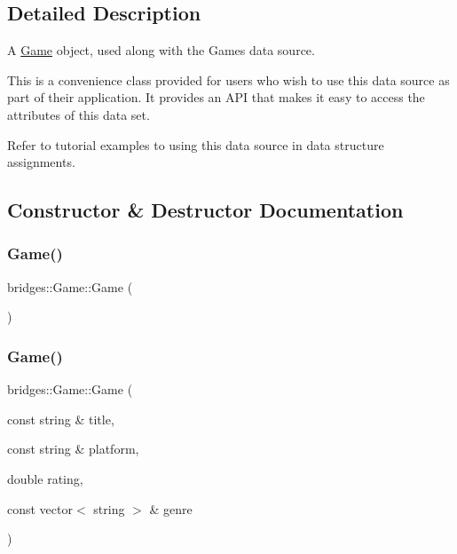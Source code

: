 \subsection{Detailed Description}
A \mbox{\hyperlink{classbridges_1_1_game}{Game}} object, used along with the Games data source. 

This is a convenience class provided for users who wish to use this data source as part of their application. It provides an A\+PI that makes it easy to access the attributes of this data set.

Refer to tutorial examples to using this data source in data structure assignments. 

\subsection{Constructor \& Destructor Documentation}
\mbox{\label{classbridges_1_1_game_a44f625a03ebf144931aa9e7e5440303c}} 
\subsubsection{\texorpdfstring{Game()}{Game()}\hspace{0.1cm}{\footnotesize\ttfamily [1/2]}}
{\footnotesize\ttfamily bridges\+::\+Game\+::\+Game (\begin{DoxyParamCaption}{ }\end{DoxyParamCaption})\hspace{0.3cm}{\ttfamily [inline]}}

\mbox{\label{classbridges_1_1_game_a2cc784203a2e9ab69141eb45714cb5db}} 
\subsubsection{\texorpdfstring{Game()}{Game()}\hspace{0.1cm}{\footnotesize\ttfamily [2/2]}}
{\footnotesize\ttfamily bridges\+::\+Game\+::\+Game (\begin{DoxyParamCaption}\item[{const string \&}]{title,  }\item[{const string \&}]{platform,  }\item[{double}]{rating,  }\item[{const vector$<$ string $>$ \&}]{genre }\end{DoxyParamCaption})\hspace{0.3cm}{\ttfamily [inline]}}



